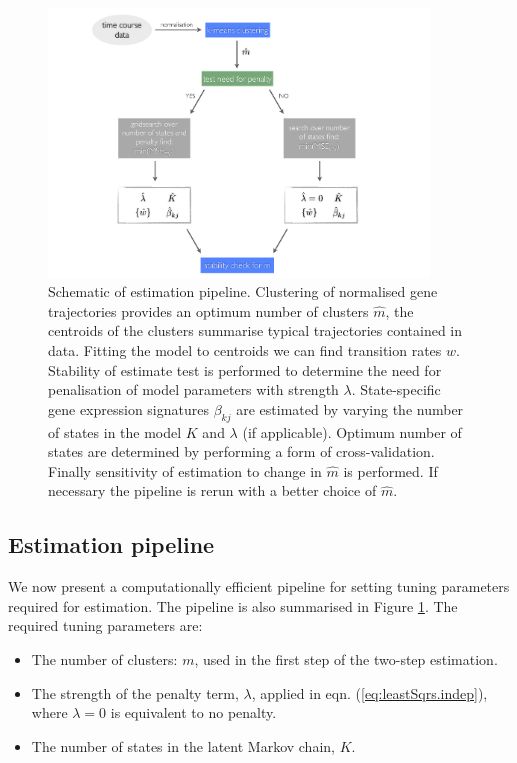 \begin{figure}
  \centering
  \includegraphics[width=0.9\textwidth]{pics/pipeline.pdf}
  \caption{Schematic of estimation pipeline. Clustering of normalised gene trajectories provides an optimum number of clusters $\hat{m}$, the centroids of the clusters summarise typical trajectories contained in data. Fitting the model to centroids we can find transition rates $w$. Stability of estimate test is performed to determine the need for penalisation of model parameters with strength $\lambda$. State-specific gene expression signatures $\beta_{kj}$ are estimated by varying the number of states in the model $K$ and $\lambda$ (if applicable). Optimum number of states are determined by performing a form of cross-validation. Finally sensitivity of estimation to change in $\hat{m}$ is performed. If necessary the pipeline is rerun with a better choice of $\hat{m}$.}
  \label{fig:pipeline}
\end{figure}

\subsection{Estimation pipeline}
\label{sec:estim-pipe}

We now present a computationally efficient pipeline for setting tuning parameters required for estimation. The pipeline is also summarised in Figure \ref{fig:pipeline}. The required tuning parameters are:

\begin{itemize}
\item The number of clusters: $m$, used in the first step of the two-step estimation.
\item The strength of the penalty term, $\lambda$, applied in eqn. (\ref{eq:leastSqrs.indep}), where $\lambda=0$ is equivalent to no penalty.
\item The number of states in the latent Markov chain, $K$.
\end{itemize}

